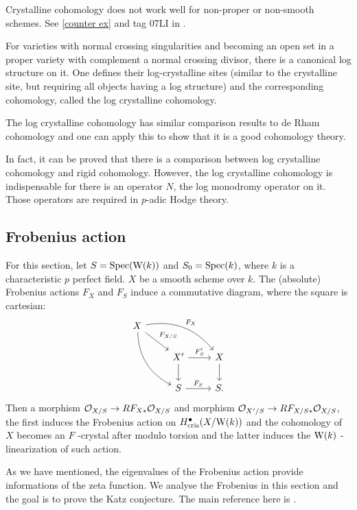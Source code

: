 \begin{remark}
    Crystalline cohomology does not work well for non-proper or non-smooth schemes. 
    See \ref{counter ex} and tag 07LI in \cite{Sta}.
\end{remark}

\begin{remark}
    For varieties with normal crossing singularities and 
    becoming an open set in a proper variety 
    with complement a normal crossing divisor, 
    there is a canonical log structure on it. 
    One defines their log-crystalline sites 
    (similar to the crystalline site, but requiring all objects having a log structure) 
    and the corresponding cohomology, called the log crystalline cohomology. 
    
    The log crystalline cohomology has similar comparison results to de Rham cohomology 
    and one can apply this to show that it is a good cohomology theory.

    In fact, it can be proved that 
    there is a comparison between log crystalline cohomology and rigid cohomology. 
    However, the log crystalline cohomology is indispensable for there is an operator $N$, 
    the log monodromy operator on it. 
    Those operators are required in $p$-adic Hodge theory.
\end{remark}

\subsection{Frobenius action}
For this section, let $S = \operatorname{Spec} (\mathrm{W}(k))$ and $S_0 = \operatorname{Spec} (k)$, 
where $k$ is a characteristic $p$ perfect field. 
$X$ be a smooth scheme over $k$. 
The (absolute) Frobenius actions $F_X$ and $F_S$ induce a commutative diagram, 
where the square is cartesian:
\[
    \begin{tikzcd}
        X \ar[ddr, bend right] \ar[dr, "{F_{X/S}}"] \ar[drr, "F_X", bend left] \\
        & X'\ar[r, "{F_S'}"] \ar[d] & X \ar[d]\\
        & S \ar[r, "{F_S}"] & S.
    \end{tikzcd}
\]
Then a morphism ${\mathcal {O}}_{X/S} \to RF_{X*} {\mathcal {O}}_{X/S}$ 
and morphism ${\mathcal {O}}_{X'/S} \to RF_{X/S*} {\mathcal {O}}_{X/S}$, 
the first induces the Frobenius action on $H^\bullet_{\mathrm{cris}}(X/\mathrm{W}(k))$ and the cohomology of $X$ 
becomes an $F$ -crystal after modulo torsion 
and the latter induces the $\mathrm{W}(k)$ -linearization of such action.

As we have mentioned, the eigenvalues of the Frobenius action 
provide informations of the zeta function. 
We analyse the Frobenius in this section and the goal is to prove the Katz conjecture. 
The main reference here is \cite{BO}.

